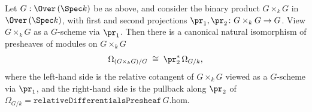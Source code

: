 \begin{lemma}
  \notready
  Let \(G : \Over\,(\Spec k)\) be as above, and consider the binary product \(G \times_{k} G\) in \(\Over\,(\Spec k)\), with first and second projections \(\pr_{1}, \pr_{2} \colon G \times_{k} G \to G\). View \(G \times_{k} G\) as a \(G\)-scheme via \(\pr_{1}\). Then there is a canonical natural isomorphism of presheaves of modules on \(G \times_{k} G\)
  \[
    \Omega_{(G \times_{k} G)/G} \;\cong\; \pr_{2}^{*}\,\Omega_{G/k},
  \]
  where the left-hand side is the relative cotangent of \(G \times_{k} G\) viewed as a \(G\)-scheme via \(\pr_{1}\), and the right-hand side is the pullback along \(\pr_{2}\) of \(\Omega_{G/k} = \texttt{relativeDifferentialsPresheaf}\,G.\mathrm{hom}\).
\end{lemma}

